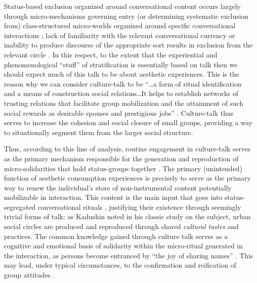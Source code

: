 Status-based exclusion organized around conversational content occurs largely through micro-mechanisms governing entry (or determining systematic exclusion from) class-structured micro-worlds organized around specific conversational interactions \citep{collins75, collins00}; lack of familiarity with the relevant conversational currency or inability to produce discourse of the appropriate sort results in exclusion from the relevant circle \citep{erickson96, purcell07}.  In this respect, to the extent that the experiential and phenomenological ``stuff'' of stratification is essentially based on talk then we should expect much of this talk to be about aesthetic experiences.  This is the reason why we can consider culture-talk to be ``\ldots a form of ritual identification and a means of construction social relations\ldots It helps to establish networks of trusting relations that facilitate group mobilization and the attainment of such social rewards as desirable spouses and prestigious jobs'' \citep[443]{dimaggio87}.  Culture-talk thus serves to increase the cohesion and social closure of small groups, providing a way to situationally segment them from the larger social structure.

Thus, according to this line of analysis, routine engagement in culture-talk serves as the primary mechanism responsible for the generation and reproduction of micro-solidarities that hold status-groups together \citep{fine77, ostrower98}.  The primary (unintended) function of aesthetic consumption experiences is precisely to serve as the primary way to renew the individual's store of non-instrumental content potentially mobilizable in interaction. This content is the main input that goes into status-segregated conversational rituals \citep[125]{collins75}, justifying their existence through seemingly trivial forms of talk: as Kadushin \citeyearpar[797]{kadushin66} noted in his classic study on the subject, urban social circles are produced and reproduced through shared \emph{cultural tastes} and practices. The common knowledge gained through culture talk serves as a cognitive and emotional basis of solidarity within the micro-ritual generated in the interaction, as persons become entranced by ``the joy of sharing names'' \citep{dimaggio87}. This may lead, under typical circumstances, to the confirmation and reification of group attitudes \citep[461]{fine77}. 
